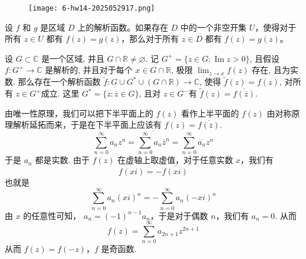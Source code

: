 \begin{exercise}
\begin{figure}[H]
\centering
\texttt{[image: 6-hw14-2025052917.png]}
\label{}
\end{figure}
\end{exercise}
\begin{theorem}[唯一性原理]
设 $f$ 和 $g$ 是区域 $D$ 上的解析函数。如果存在 $D$ 中的一个非空开集 $U$，使得对于所有 $z \in U$ 都有 $f(z) = g(z)$，那么对于所有 $z \in D$ 都有 $f(z) = g(z)$。
\end{theorem}
\begin{theorem}[对称原理]
设 $G \subset \mathbb{C}$ 是一个区域, 并且 $G \cap \mathbb{R} \neq \varnothing$. 记 $G^{+}=\{z \in G: \operatorname{Im} z>0\}$, 且假设 $f: G^{+} \rightarrow \mathbb{C}$ 是解析的, 并且对于每个 $x \in G \cap \mathbb{R}$, 极限 $\lim _{z \rightarrow x} f(z)$ 存在, 且为实数. 那么存在一个解析函数 $\tilde{f}: G \cup G^{*} \cup(G \cap \mathbb{R}) \rightarrow \mathbb{C}$, 使得 $\tilde{f}(z)=f(z)$, 对所有 $z \in G^{+}$成立. 这里 $G^{*}=\{z: \overline{z} \in G\}$, 且对 $z \in G^{-}$有 $\tilde{f}(z)=\overline{f(\overline{z})}$.
\end{theorem}
由唯一性原理，我们可以把下半平面上的 $f(z)$ 看作上半平面的 $f(z)$ 由对称原理解析延拓而来，于是在下半平面上应该有 $f(z)=\overline{f(\overline{z})}$.
\[
\sum_{n=0}^{\infty} a_nz^{n}=\overline{\sum_{n=0}^{\infty} a_n\overline{z}^{n}}=\sum_{n=0}^{\infty} \overline{a_n}z^{n}
\]
于是 $a_n$ 都是实数. 由于 $f(z)$ 在虚轴上取虚值，对于任意实数 $x$，我们有
\[
f(xi)=-\overline{f(x i)}
\]
也就是
\[
\sum_{n=0}^{\infty} a_n(xi)^{n}=-\sum_{n=0}^{\infty} a_n(-xi)^{n}
\]
由 $x$ 的任意性可知， $a_n=(-1)^{n-1}a_n$，于是对于偶数 $n$，我们有 $a_n=0$. 从而
\[
f(z)=\sum_{n=0}^{\infty} a_{2n+1}z^{2n+1}
\]
从而 $f(z)=f(-z)$，$f$ 是奇函数.
